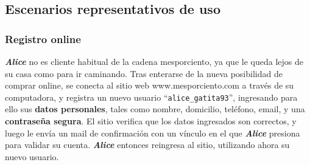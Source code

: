 \newpage
\subsection{Escenarios representativos de uso}
  

  
  

\subsubsection{Registro online}

\textbf{\emph{Alice}} no es cliente habitual de la cadena mesporciento, ya que
le queda lejos de su casa como para ir caminando. Tras enterarse de la nueva
posibilidad de comprar online, se conecta al sitio web www.mesporciento.com a
través de su computadora, y registra un nuevo usuario
``\texttt{alice\_gatita93}'', ingresando para ello sus \textbf{datos
personales}, tales como nombre, domicilio, teléfono, email, y una
\textbf{contraseña segura}. El sitio verifica que los datos ingresados son
correctos, y luego le envía un mail de confirmación con un vínculo en el que
\textbf{\emph{Alice}} presiona para validar su cuenta. \textbf{\emph{Alice}}
entonces reingresa al sitio, utilizando ahora su nuevo usuario.

